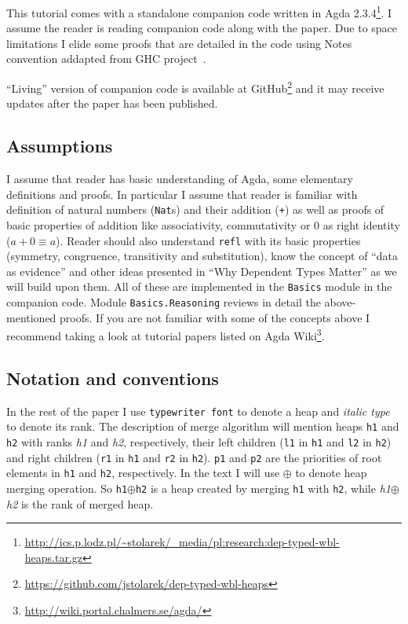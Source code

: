 This tutorial comes with a standalone companion code written in Agda 2.3.4\footnote{\url{http://ics.p.lodz.pl/~stolarek/_media/pl:research:dep-typed-wbl-heaps.tar.gz}}. I assume the reader is reading companion code along with the paper. Due to space limitations I elide some proofs that are detailed in the code using Notes convention addapted from GHC project~\cite{MarPey12}.

``Living'' version of companion code is available at GitHub\footnote{\url{https://github.com/jstolarek/dep-typed-wbl-heaps}} and it may receive updates after the paper has been published.

\subsection{Assumptions}

I assume that reader has basic understanding of Agda, some elementary definitions and proofs. In particular I assume that reader is familiar with definition of natural numbers (\texttt{Nat}s) and their addition (\texttt{+}) as well as proofs of basic properties of addition like associativity, commutativity or 0 as right identity ($a + 0 ≡ a$). Reader should also understand \texttt{refl} with its basic properties (symmetry, congruence, transitivity and substitution), know the concept of ``data as evidence'' and other ideas presented in ``Why Dependent Types Matter'' \cite{AltMcBMcK05} as we will build upon them. All of these are implemented in the \texttt{Basics} module in the companion code. Module \texttt{Basics.Reasoning} reviews in detail the above-mentioned proofs. If you are not familiar with some of the concepts above I recommend taking a look at tutorial papers listed on Agda Wiki\footnote{\url{http://wiki.portal.chalmers.se/agda/}}.

\subsection{Notation and conventions}

In the rest of the paper I use \texttt{typewriter font} to denote a heap and \textit{italic type} to denote its rank. The description of merge algorithm will mention heaps \texttt{h1} and \texttt{h2} with ranks \textit{h1} and \textit{h2}, respectively, their left children (\texttt{l1} in \texttt{h1} and \texttt{l2} in \texttt{h2}) and right children (\texttt{r1} in \texttt{h1} and \texttt{r2} in \texttt{h2}). \texttt{p1} and \texttt{p2} are the priorities of root elements in \texttt{h1} and \texttt{h2}, respectively. In the text I will use $\oplus$ to denote heap merging operation. So \texttt{h1}$\oplus$\texttt{h2} is a heap created by merging \texttt{h1} with \texttt{h2}, while \textit{h1}$\oplus$\textit{h2} is the rank of merged heap.

